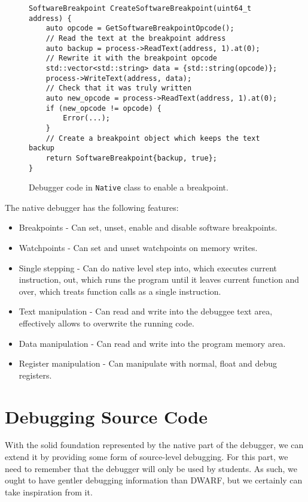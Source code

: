 \begin{figure}
    \begin{verbatim}
SoftwareBreakpoint CreateSoftwareBreakpoint(uint64_t address) {
    auto opcode = GetSoftwareBreakpointOpcode();
    // Read the text at the breakpoint address
    auto backup = process->ReadText(address, 1).at(0);
    // Rewrite it with the breakpoint opcode
    std::vector<std::string> data = {std::string(opcode)};
    process->WriteText(address, data);
    // Check that it was truly written
    auto new_opcode = process->ReadText(address, 1).at(0);
    if (new_opcode != opcode) {
        Error(...);
    }
    // Create a breakpoint object which keeps the text backup
    return SoftwareBreakpoint{backup, true};
}
    \end{verbatim}
    \caption{Debugger code in \texttt{Native} class to enable a breakpoint.}
    \label{t86dbg:breakpoint}
\end{figure}

The native debugger has the following features:
\begin{itemize}
    \item Breakpoints - Can set, unset, enable and disable software breakpoints.
    \item Watchpoints - Can set and unset watchpoints on memory writes.
    \item Single stepping - Can do native level step into, which executes
        current instruction, out, which runs the program until it leaves
        current function and over, which treats function calls as a single
        instruction.
    \item Text manipulation - Can read and write into the debuggee text area,
        effectively allows to overwrite the running code.
    \item Data manipulation - Can read and write into the program memory area.
    \item Register manipulation - Can manipulate with normal, float and debug registers.
\end{itemize}

\section{Debugging Source Code}\label{section:source-debugger}
With the solid foundation represented by the native part of the debugger, we
can extend it by providing some form of source-level debugging. For this part,
we need to remember that the debugger will only be used by students. As such,
we ought to have gentler debugging information than DWARF, but we certainly can
take inspiration from it.

